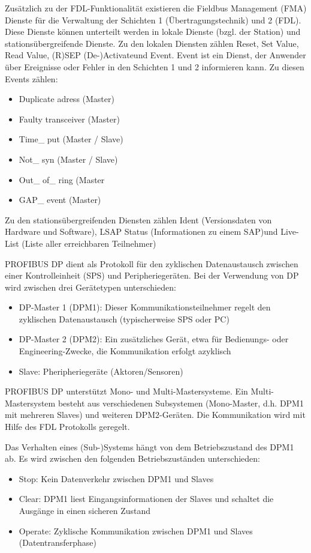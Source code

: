 Zusätzlich zu der FDL-Funktionalität existieren die Fieldbus Management (FMA) Dienste für die Verwaltung der Schichten 1 (Übertragungstechnik) und 2 (FDL). Diese Dienste können unterteilt werden in lokale Dienste (bzgl. der Station) und stationsübergreifende Dienste. Zu den lokalen Diensten zählen \glqq Reset\grqq , \glqq Set Value\grqq , \glqq Read Value\grqq , \glqq (R)SEP (De-)Activate\grqq  und \glqq Event\grqq . Event ist ein Dienst, der Anwender über Ereignisse oder Fehler in den Schichten 1 und 2 informieren kann. Zu diesen Events zählen:
\begin{itemize}
\item Duplicate adress (Master)
\item Faulty transceiver (Master)
\item Time\_ put (Master / Slave)
\item Not\_ syn (Master / Slave)
\item Out\_ of\_ ring (Master
\item GAP\_ event (Master)
\end{itemize}

Zu den stationsübergreifenden Diensten zählen \glqq Ident (Versionsdaten von Hardware und Software)\grqq , \glqq LSAP Status (Informationen zu einem SAP)\grqq  und \glqq Live-List (Liste aller erreichbaren Teilnehmer)\grqq

PROFIBUS DP dient als Protokoll für den zyklischen Datenaustausch zwischen einer Kontrolleinheit (SPS) und Peripheriegeräten. Bei der Verwendung von DP wird zwischen drei Gerätetypen unterschieden:
\begin{itemize}
\item DP-Master 1 (DPM1): Dieser Kommunikationsteilnehmer regelt den zyklischen Datenaustausch (typischerweise SPS oder PC)
\item DP-Master 2 (DPM2): Ein zusätzliches Gerät, etwa für Bedienungs- oder Engineering-Zwecke, die Kommunikation erfolgt azyklisch
\item Slave: Pheripheriegeräte (Aktoren/Sensoren)
\end{itemize}

PROFIBUS DP unterstützt Mono- und Multi-Mastersysteme. Ein Multi-Mastersystem besteht aus verschiedenen Subsystemen (Mono-Master, d.h. DPM1 mit mehreren Slaves) und weiteren DPM2-Geräten. Die Kommunikation wird mit Hilfe des FDL Protokolls geregelt.


Das Verhalten eines (Sub-)Systems hängt von dem Betriebszustand des DPM1 ab. Es wird zwischen den folgenden Betriebszuständen unterschieden:
\begin{itemize}
\item Stop: Kein Datenverkehr zwischen DPM1 und Slaves
\item Clear: DPM1 liest Eingangsinformationen der Slaves und schaltet die Ausgänge in einen sicheren Zustand
\item Operate: Zyklische Kommunikation zwischen DPM1 und Slaves (Datentransferphase)
\end{itemize}

